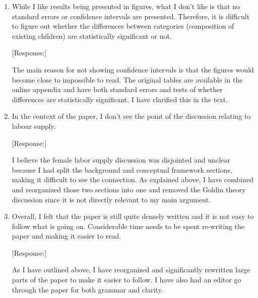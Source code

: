 \documentclass[letterpaper,12pt]{article}
\begin{document}
\begin{enumerate}
[Response:]

The 2004 break is an attempt to understand whether we observe the beginning of
a reversal in son preference and the use of sex selection as hypothesized by part of
the prior literature.
I have made two changes to make this clearer.

First, in the ``Data'' section, I have split the paragraph on the periods into two and expanded 
the discussion of the motivation for the breaks, including adding two additional
references arguing that we might see a decline in use.
The 2004/2005 break is somewhat arbitrary but does have the advantage of making 
the periods close to the same length (there are relatively few birth intervals that begin 
in 2015 and 2016).

Second, I now discuss the changes between the last two periods in more detail in the 
subsection on birth spacing with sex selection and in the Conclusion.

\item While I like results being presented in figures, what I don’t like
is that no standard errors or confidence intervals are presented.
Therefore, it is difficult to figure out whether the differences between
categories (composition of existing children) are statistically
significant or not.

[Response:]

The main reason for not showing confidence intervals is that the figures would become close 
to impossible to read. 
The original tables are available in the online appendix and have both standard 
errors and tests of whether differences are statistically significant. 
I have clarified this in the text.

\item In the context of the paper, I don’t see the point of the
discussion relating to labour supply.

[Response:]

I believe the female labor supply discussion was disjointed and unclear because I had split the 
background and conceptual framework sections, making it diﬀicult to see the connection. 
As explained above, I have combined and reorganized those two sections into one and removed 
the Goldin theory discussion since it is not directly relevant to my main argument.

\item Overall, I felt that the paper is still quite densely written and
it is not easy to follow what is going on. Considerable time needs to be
spent re-writing the paper and making it easier to read.

[Response:]

As I have outlined above, I have reorganized and significantly rewritten large parts of 
the paper to make it easier to follow. 
I have also had an editor go through the paper for both grammar and clarity.

\end{enumerate}



\newpage


\end{document}
